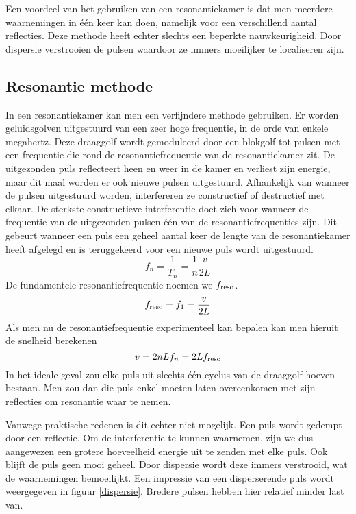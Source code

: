 Een voordeel van het gebruiken van een resonantiekamer is dat
men meerdere waarnemingen in \'e\'en keer kan doen, namelijk voor een 
verschillend aantal reflecties.
Deze methode heeft echter slechts een beperkte nauwkeurigheid. Door 
dispersie verstrooien de pulsen waardoor ze immers moeilijker te 
localiseren zijn.

\subsection{Resonantie methode}

In een resonantiekamer kan men een verfijndere methode gebruiken. Er worden 
geluidsgolven uitgestuurd van een zeer hoge frequentie, in de orde van enkele 
megahertz. Deze draaggolf wordt gemoduleerd door een blokgolf tot pulsen 
met een frequentie die rond de resonantiefrequentie van de resonantiekamer 
zit.  De uitgezonden puls reflecteert heen en weer in de kamer en verliest 
zijn energie, maar dit maal worden er ook nieuwe pulsen uitgestuurd.  
Afhankelijk van wanneer de pulsen uitgestuurd worden, interfereren ze 
constructief of destructief met elkaar. De sterkste constructieve 
interferentie doet zich voor wanneer de frequentie van de uitgezonden 
pulsen \'e\'en van de resonantiefrequenties zijn. Dit gebeurt wanneer een 
puls een geheel aantal keer de lengte van de resonantiekamer heeft afgelegd 
en is teruggekeerd voor een nieuwe puls wordt uitgestuurd.
\begin{equation}
\label{resfreq}
f_n = \frac{1}{T_n} = \frac{1}{n} \frac{v}{2L}
\end{equation}
De fundamentele resonantiefrequentie noemen we $f_\mathrm{reso}$.
$$
f_\mathrm{reso} = f_1 = \frac{v}{2L}
$$
Als men nu de resonantiefrequentie experimenteel kan bepalen kan men hieruit de 
snelheid berekenen
\begin{equation}
\label{v-ifv-f}
v = 2nLf_n = 2L f_\mathrm{reso}
\end{equation}
In het ideale geval zou elke puls uit slechts \'e\'en cyclus van de draaggolf 
hoeven bestaan. Men zou dan die puls enkel moeten laten overeenkomen met 
zijn reflecties om resonantie waar te nemen.

Vanwege praktische redenen is dit echter niet mogelijk. Een puls wordt 
gedempt door een reflectie. Om de interferentie te kunnen waarnemen, zijn 
we dus aangewezen een grotere hoeveelheid energie uit te zenden met elke 
puls. Ook blijft de puls geen mooi geheel. Door dispersie wordt deze immers 
verstrooid, wat de waarnemingen bemoeilijkt. Een impressie van een 
disperserende puls wordt weergegeven in figuur \ref{dispersie}. Bredere 
pulsen hebben hier relatief minder last van.

